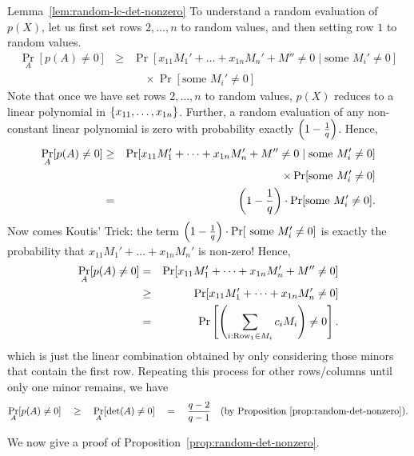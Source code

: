 \begin{proofof}{Lemma~\ref{lem:random-lc-det-nonzero}}
  To understand a random evaluation of $p(X)$, let us first set rows $2, \dots, n$ to random values, and
  then setting row $1$ to random values. 
  \begin{eqnarray*}
    \Pr_{A}[p(A)\neq 0] & \geq & \Pr[x_{11} M_1' + \dots + x_{1n} M_n' + M'' \neq 0 \;|\; \text{some }M_{i}'\neq 0]\\
    & & \quad \times \Pr[\text{some }M_i' \neq 0]
  \end{eqnarray*}
  Note that once we have set rows $2,\dots, n$ to random values, $p(X)$ reduces to a linear polynomial in $\left\{x_{11},\dots, x_{1n}\right\}$. Further, a random evaluation of any non-constant linear polynomial is zero with probability exactly $\left(1 -\frac{1}{q}\right)$. Hence, 
  \begin{eqnarray*}
\Pr_{A}[p(A)\neq 0] & \geq & \Pr[x_{11} M_1' + \dots + x_{1n} M_n' + M'' \neq 0 \;|\; \text{some }M_{i}'\neq 0]\\
 & & \quad \times \Pr[\text{some }M_i' \neq 0]\\
    & = & \left(1 - \frac{1}{q}\right)\cdot \Pr[\text{some }M_i' \neq 0].
  \end{eqnarray*}
  Now comes  Koutis' Trick: the term $\left(1 -
    \frac{1}{q}\right) \cdot \Pr[\text{ some }M_i' \neq 0]$ is exactly the
  probability that $x_{11}M_1' + \dots + x_{1n}M_n'$ is non-zero! Hence,
\begin{eqnarray*}
\Pr_{A}[p(A) \neq 0] & = & \Pr[ x_{11}M_1' + \dots + x_{1n} M_n' + M''\neq 0]\\
 & \geq & \Pr[ x_{11}M_1' + \dots + x_{1n} M_n'\neq 0]\\
 & = & \Pr\left[\left(\sum_{i:\text{Row}_1\in M_i} c_i M_i\right) \neq 0\right].
\end{eqnarray*}
which is just the linear combination obtained by only considering
those minors that contain the first row. Repeating this process for other
rows/columns until only  one minor remains, we have
$$
\Pr_{A}[p(A) \neq 0] \quad \geq \quad \Pr_{A}[\det(A) \neq 0] \quad = \quad
\frac{q-2}{q-1}\quad(\text{by Proposition~\ref{prop:random-det-nonzero}}).
$$
\end{proofof}


We now give a proof of Proposition~\ref{prop:random-det-nonzero}. 

